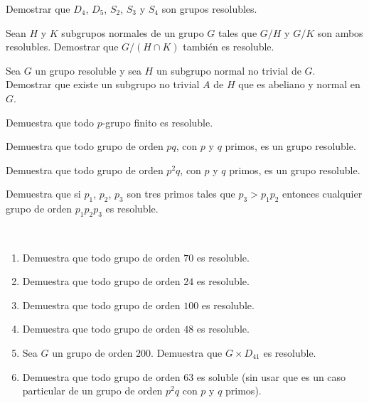 \begin{ejercicio}
    Demostrar que $D_4$, $D_5$, $S_2$, $S_3$ y $S_4$ son grupos resolubles.
\end{ejercicio}

\begin{ejercicio}
    Sean $H$ y $K$ subgrupos normales de un grupo $G$ tales que $G/H$ y $G/K$ son ambos resolubles. Demostrar que $G/(H \cap K)$ también es resoluble.
\end{ejercicio}

\begin{ejercicio}
    Sea $G$ un grupo resoluble y sea $H$ un subgrupo normal no trivial de $G$. Demostrar que existe un subgrupo no trivial $A$ de $H$ que es abeliano y normal en $G$.
\end{ejercicio}

\begin{ejercicio}
    Demuestra que todo $p$-grupo finito es resoluble.
\end{ejercicio}

\begin{ejercicio}
    Demuestra que todo grupo de orden $pq$, con $p$ y $q$ primos, es un grupo resoluble.
\end{ejercicio}

\begin{ejercicio}
    Demuestra que todo grupo de orden $p^2q$, con $p$ y $q$ primos, es un grupo resoluble.
\end{ejercicio}

\begin{ejercicio}
    Demuestra que si $p_1$, $p_2$, $p_3$ son tres primos tales que $p_3 > p_1 p_2$ entonces cualquier grupo de orden $p_1 p_2 p_3$ es resoluble.
\end{ejercicio}

\begin{ejercicio}~
    \begin{enumerate}
        \item Demuestra que todo grupo de orden $70$ es resoluble.
        \item Demuestra que todo grupo de orden $24$ es resoluble.
        \item Demuestra que todo grupo de orden $100$ es resoluble.
        \item Demuestra que todo grupo de orden $48$ es resoluble.
        \item Sea $G$ un grupo de orden $200$. Demuestra que $G \times D_{41}$ es resoluble.
        \item Demuestra que todo grupo de orden $63$ es soluble (sin usar que es un caso particular de un grupo de orden $p^2q$ con $p$ y $q$ primos).
    \end{enumerate}
\end{ejercicio}
